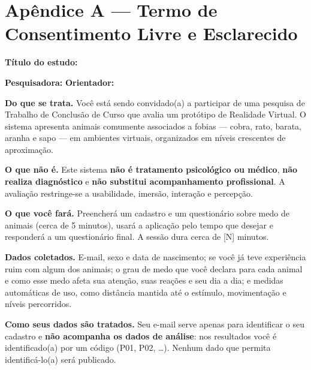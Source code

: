 \newpage
\section*{Apêndice A --- Termo de Consentimento Livre e Esclarecido}


\begingroup\singlespacing\small

\noindent\textbf{Título do estudo:} \tcctitulo

\noindent\textbf{Pesquisadora:} \tccautor \quad \textbf{Orientador:} \tccorientador

\vspace{0.4cm}
\noindent\textbf{Do que se trata.} Você está sendo convidado(a) a participar de
uma pesquisa de Trabalho de Conclusão de Curso que avalia um protótipo de
Realidade Virtual. O sistema apresenta animais comumente associados a fobias
--- cobra, rato, barata, aranha e sapo --- em ambientes virtuais, organizados em
níveis crescentes de aproximação.

\vspace{0.3cm}
\noindent\textbf{O que não é.} Este sistema \textbf{não é tratamento
psicológico ou médico}, \textbf{não realiza diagnóstico} e \textbf{não
substitui acompanhamento profissional}. A avaliação restringe-se a usabilidade,
imersão, interação e percepção.

\vspace{0.3cm}
\noindent\textbf{O que você fará.} Preencherá um cadastro e um questionário
sobre medo de animais (cerca de 5 minutos), usará a aplicação pelo tempo que
desejar e responderá a um questionário final. A sessão dura cerca de [N] minutos.

\vspace{0.3cm}
\noindent\textbf{Dados coletados.} E-mail, sexo e data de nascimento; se você
já teve experiência ruim com algum dos animais; o grau de medo que você declara
para cada animal e como esse medo afeta sua atenção, suas reações e seu dia a
dia; e medidas automáticas de uso, como distância mantida até o estímulo,
movimentação e níveis percorridos.

\vspace{0.3cm}
\noindent\textbf{Como seus dados são tratados.} Seu e-mail serve apenas para
identificar o seu cadastro e \textbf{não acompanha os dados de análise}: nos
resultados você é identificado(a) por um código (P01, P02, \ldots). Nenhum dado
que permita identificá-lo(a) será publicado.

